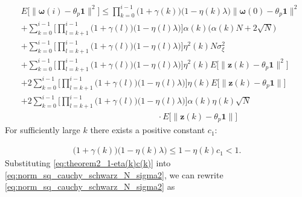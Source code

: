 \documentclass[journal]{IEEEtran}
\begin{document}
\vspace{-4mm}
\footnotesize 
\begin{align}
&E\bigg[\Big\| \bm{\omega}(i) - \theta_p \mathbf{1}\Big\|^2\bigg] \le \prod_{k=0}^{i-1} \Big( 1 + \gamma(k) \Big)\Big(1-\eta(k)\lambda\Big) \big\|\bm{\omega}(0)-\theta_p\mathbf{1}\big\|^2 \nonumber \\
&+\sum_{k=0}^{i-1} \Bigg[\prod_{l=k+1}^{i-1}\Big( 1 + \gamma(l) \Big)\Big(1-\eta(l)\lambda\Big)\Bigg]\alpha(k)\Big(\alpha(k)N + 2\sqrt{N}\Big) \nonumber \\
&+\sum_{k=0}^{i-1} \Bigg[\prod_{l=k+1}^{i-1}\Big( 1 + \gamma(l)\Big)\Big(1-\eta(l)\lambda\Big)\Bigg]\eta^2(k)N\sigma_\xi^2 \nonumber \\
&+\sum_{k=0}^{i-1} \Bigg[\prod_{l=k+1}^{i-1}\Big( 1 + \gamma(l)\Big)\Big(1-\eta(l)\lambda\Big)\Bigg] \eta^2(k)E\Big[\big\|\mathbf{z}(k) - \theta_p\mathbf{1}\big\|^2\Big]  \nonumber \\
&+2 \sum_{k=0}^{i-1} \Bigg[\prod_{l=k+1}^{i-1}\Big( 1 + \gamma(l)\Big)\Big(1-\eta(l)\lambda\Big)\Bigg] \eta(k) E\Big[\big\|\mathbf{z}(k)- {\theta_p}\mathbf{1}\big\| \Big] \nonumber \\
&+2 \sum_{k=0}^{i-1} \Bigg[\prod_{l=k+1}^{i-1}\Big( 1 + \gamma(l)\Big)\Big(1-\eta(l)\lambda\Big)\Bigg] \alpha(k)\eta(k)\sqrt{N} \nonumber \\
&\,\,\,\,\,\,\,\,\,\,\,\,\,\,\,\,\,\,\,\,\,\,\,\,\,\,\,\,\,\,\,\,\,\,\,\,\,\,\,\,\,\,\,\,\,\,\,\,\,\,\,\,\,\,\,\,\,\,\,\,\,\,\,\,\,\,\,\,\,\,\,\,\,\,\,\,\,\,\,\,\,\,\,\,\,\,\,\,\,\,\,\,\,\,\,\,\,\cdot E\Big[ \big\|\mathbf{z}(k)- {\theta_p}\mathbf{1} \big\| \Big] \label{eq:norm_sq_cauchy_schwarz_N_sigma2}
\end{align} 
\normalsize
For sufficiently large $k$ there exists a positive constant $c_1$:

\vspace{-4mm}
\small
\begin{align}
\Big( 1 + \gamma(k)\Big)\Big(1-\eta(k)\lambda\Big) \le 1 - \eta(k)c_1 < 1.\label{eq:theorem2_1-eta(k)c(k)}
\end{align}
\normalsize
Substituting \eqref{eq:theorem2_1-eta(k)c(k)} into \eqref{eq:norm_sq_cauchy_schwarz_N_sigma2}, we can rewrite \eqref{eq:norm_sq_cauchy_schwarz_N_sigma2} as 
\end{document}
